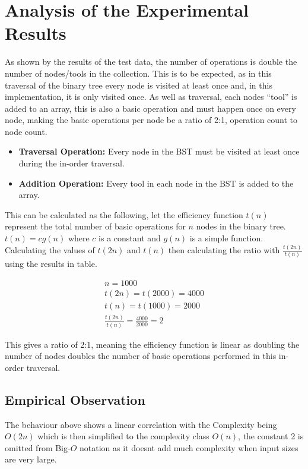 \documentclass[10pt,a4paper]{report}
\begin{document}
\section{Analysis of the Experimental Results}
As shown by the results of the test data, the number of operations is double the number of nodes/tools in the collection. This is to be expected, as in this traversal of the binary tree every node is visited at least once and, in this implementation, it is only visited once. As well as traversal, each nodes “tool” is added to an array, this is also a basic operation and must happen once on every node, making the basic operations per node be a ratio of 2:1, operation count to node count. 

\begin{itemize}
	\item \textbf{Traversal Operation:} Every node in the BST must be visited at least once during the in-order traversal. 
	\item \textbf{Addition Operation:} Every tool in each node in the BST is added to the array. 
\end{itemize}

This can be calculated as the following, let the efficiency function \(t(n)\) represent the total number of basic operations for \(n\) nodes in the binary tree. \(t(n)=cg(n)\) where \(c\) is a constant and \(g(n)\) is a simple function. Calculating the values of \(t(2n)\) and \(t(n)\) then calculating the ratio with \( \frac {t(2n)}{t(n)} \) using the results in table.

\begin{equation}
\begin{split}
	n = 1000 \\
    t(2n) = t(2000) = 4000 \\
    t(n) = t(1000) = 2000 \\
    \frac{t(2n)}{t(n)} = \frac{4000}{2000} = 2 
\end{split}
\end{equation}

This gives a ratio of 2:1, meaning the efficiency function is linear as doubling the number of nodes doubles the number of basic operations performed in this in-order traversal. 

\subsection{Empirical Observation}

The behaviour above shows a linear correlation with the Complexity being \(O(2n)\) which is then simplified to the complexity class \(O(n)\), the constant 2 is omitted from Big-\(O\) notation as it doesnt add much complexity when input sizes are very large. 
\end{document}
